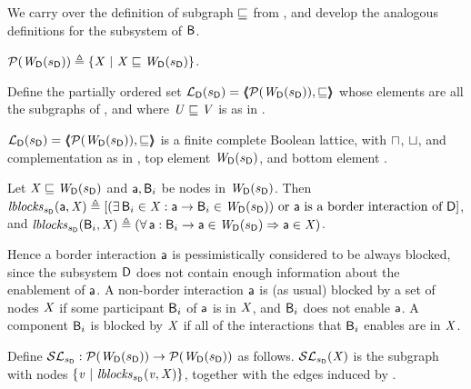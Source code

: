 We carry over the definition of subgraph $\subg$ from , and develop the analogous definitions for the subsystem \DS
of $\B$. 


\begin{definition} \label{defn:wsetOfSubgraphsLoc}
$\lwfgS{B}{\sD}{\DS} \df  \set{ \XS \stt \XS \subg \lwfg{B}{\sD}{\DS} }$.
\end{definition}

\begin{definition} \label{defn:wflatticeLoc}
Define the partially ordered set 
$\llat{\B}{\sD}{\DS}  = \tpl{ \lwfgS{B}{\sD}{\DS},  \subg }$ 
whose elements are all the subgraphs of 
, and where  $\US \subg \VS$ is as in .   
\end{definition}

\begin{proposition} \label{prop:isALatticeLoc}
$\llat{\B}{\sD}{\DS}  = \tpl{ \lwfgS{B}{\sD}{\DS},  \subg }$
 is a finite complete Boolean lattice, with $\meet$, $\join$, and complementation as in 
, top element $\lwfg{B}{\sD}{\DS}$, and bottom element \ewfg.
\end{proposition}

\begin{definition} \label{defn:blocksLoc}
Let $\XS \subg \lwfg{\B}{\sD}{\DS}$ and $\act, \B_i$ be nodes in $\lwfg{B}{\sD}{\DS}$. Then 
$\lblocks{\sD}{\act}{\XS} \df
[ (\ex \B_i \in \XS : \act \ar \B_i \in \lwfg{B}{\sD}{\DS})
   \mbox{ or $\act$ is a border interaction of $\DS$} ]$, and 
$\lblocks{\sD}{\B_i}{\XS} \df (\fa \act : \B_i \ar \act \in \lwfg{B}{\sD}{\DS} \imp \act \in \XS)$.
\end{definition}
Hence a border interaction $\act$ is pessimistically considered to be always blocked, since
the subsystem $\DS$ does not contain enough information about the enablement of $\act$.
A non-border interaction $\act$ is (as usual) blocked by a set of nodes $\XS$ if some participant $\B_i$ of 
$\act$ is in $\XS$, and $\B_i$ does not enable $\act$.
A component $\B_i$ is blocked by $\XS$ if all of the interactions that $\B_i$ enables are in $\XS$.


\begin{definition}[$\lSFsymb_{\sD}$] \label{defn:scFixLoc}
Define $\lSFsymb_{\sD}:  \lwfgS{B}{\sD}{\DS}  \to  \lwfgS{B}{\sD}{\DS}$ as follows.
$\lSFs{\sD}{\XS}$ is the subgraph with nodes $\set{\ndv \stt \lblocks{\sD}{\ndv}{\XS} }$, together with the edges induced by .
\end{definition}

